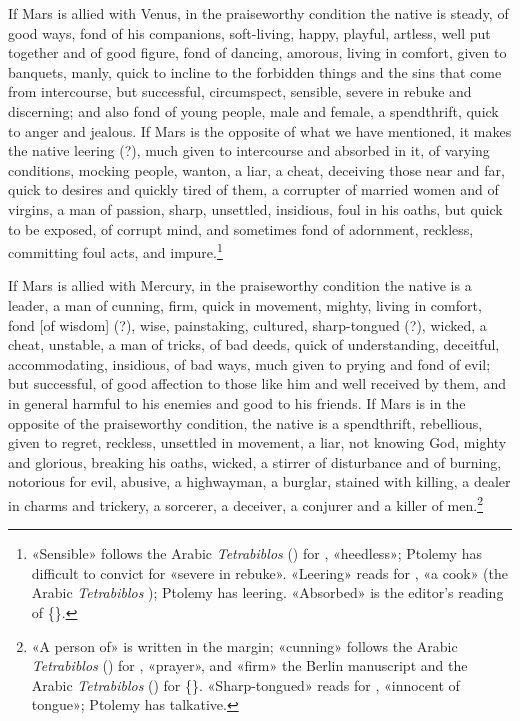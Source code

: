 \documentclass[11pt]{article}
\newcommand{\Fol}[1]{\marginpar{\footnotesize\color{gray}f.\,#1}}
\begin{document}
\par \Fol{59v}If Mars is allied with Venus, in the praiseworthy condition the native is steady, of good ways, fond of his companions, soft-living, happy, playful, artless, well put together and of good figure, fond of dancing, amorous, living in comfort, given to banquets, manly, quick to incline to the forbidden things and the sins that come from intercourse, but successful, circumspect, sensible, severe in rebuke and discerning; and also fond of young people, male and female, a spendthrift, quick to anger and jealous. If Mars is the opposite of what we have mentioned, it makes the native leering (?), much given to intercourse and absorbed in it, of varying conditions, mocking people, wanton, a liar, a cheat, deceiving those near and far, quick to desires and quickly tired of them, a corrupter of married women and of virgins, a man of passion, sharp, unsettled, insidious, foul in his oaths, but quick to be exposed, of corrupt mind, and sometimes fond of adornment, reckless, committing foul acts, and impure.\footnote{«Sensible» follows the Arabic \emph{Tetrabiblos} () for , «heedless»; Ptolemy has difficult to convict for «severe in rebuke». «Leering» reads  for , «a cook» (the Arabic \emph{Tetrabiblos} ); Ptolemy has leering. «Absorbed» is the editor's reading of \{\}.}\par
\par \Fol{60r}If Mars is allied with Mercury, in the praiseworthy condition the native is a leader, a man of cunning, firm, quick in movement, mighty, living in comfort, fond [of wisdom] (?), wise, painstaking, cultured, sharp-tongued (?), wicked, a cheat, unstable, a man of tricks, of bad deeds, quick of understanding, deceitful, accommodating, insidious, of bad ways, much given to prying and fond of evil; but successful, of good affection to those like him and well received by them, and in general harmful to his enemies and good to his friends. If Mars is in the opposite of the praiseworthy condition, the native is a spendthrift, rebellious, given to regret, reckless, unsettled in movement, a liar, not knowing God, mighty and glorious, breaking his oaths, wicked, a stirrer of disturbance and of burning, notorious for evil, abusive, a highwayman, a burglar, stained with killing, a dealer in charms and trickery, a sorcerer, a deceiver, a conjurer and a killer of men.\footnote{«A person of» is written in the margin; «cunning» follows the Arabic \emph{Tetrabiblos} () for , «prayer», and «firm» the Berlin manuscript and the Arabic \emph{Tetrabiblos} () for \{\}. «Sharp-tongued» reads  for , «innocent of tongue»; Ptolemy has talkative.}\par
\end{document}

